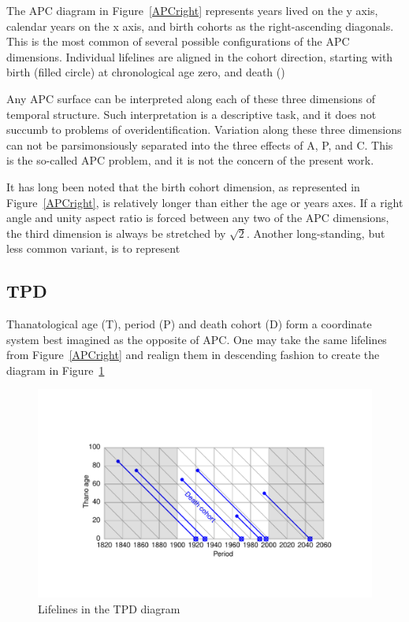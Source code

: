 \documentclass[11pt,oneside]{article} %
\begin{document}
The APC diagram in Figure~\ref{APCright} represents years lived on the y axis,
calendar years on the x axis, and birth cohorts as the right-ascending
diagonals. This is the most common of several possible configurations
of the APC dimensions. Individual lifelines are aligned in the cohort direction,
starting with birth (filled circle) at chronological age zero, and death ()

Any APC surface can be interpreted along each of these
three dimensions of temporal structure. Such interpretation is a descriptive
task, and it does not succumb to problems of overidentification. Variation along
these three dimensions can not be parsimonsiously separated into the three
effects of A, P, and C. This is the so-called APC problem, and it is not the concern of the
present work. 

It has long been noted \citep{zeuner1869abhandlungen, perozzo1880della} that the
birth cohort dimension, as represented in Figure~\ref{APCright}, is relatively
longer than either the age or years axes. If a right angle and unity aspect
ratio is forced between any two of the APC dimensions, the third dimension is always be
stretched by $\sqrt{2}$. Another long-standing, but less common variant, is to
represent

\FloatBarrier

\subsection*{TPD}

Thanatological age (T), period (P) and death cohort (D) form a coordinate system
best imagined as the opposite of APC. One may take the same lifelines from
Figure~\ref{APCright} and realign them in descending fashion to create the
diagram in Figure~\ref{TPDright}

\begin{figure}[b!]
    \centering
    \includegraphics[scale=.7]{Figures/LabPres/TPD2.pdf}
    \caption{Lifelines in the TPD diagram}
    \label{TPDright}
\end{figure} 
\end{document}
